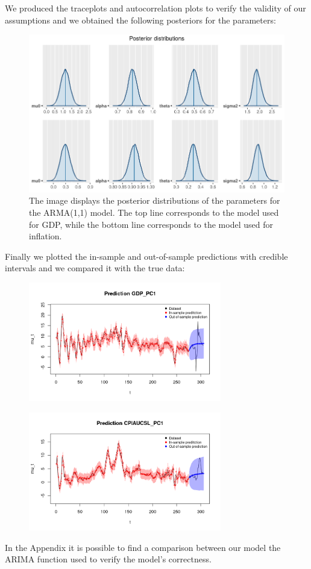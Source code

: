We produced the traceplots and autocorrelation plots to verify the validity of our assumptions and we obtained the following posteriors for the parameters: \\
\begin{figure}[H]
    \centering
    \includegraphics[width=\textwidth]{images/4-ARMA/posteriors.png}
    \caption{The image displays the posterior distributions of the parameters for the ARMA(1,1) model. The top line corresponds to the model used for GDP, while the bottom line corresponds to the model used for inflation.}
    \label{fig:ARMA_posteriors}
\end{figure}
Finally we plotted the in-sample and out-of-sample predictions with credible intervals and we compared it with the true data: \\   
\begin{figure}[H]
    \centering
    \includegraphics[width=0.75\textwidth]{images/4-ARMA/gdp_prediction.png}
    \label{fig:ARMA_first}
\end{figure} 
\begin{figure}[H]
    \centering
    \includegraphics[width=0.75\textwidth]{images/4-ARMA/infl_prediction.png}
    \label{fig:ARMA_second}
\end{figure} 
In the Appendix it is possible to find a comparison between our model the ARIMA function used to verify the model's correctness.